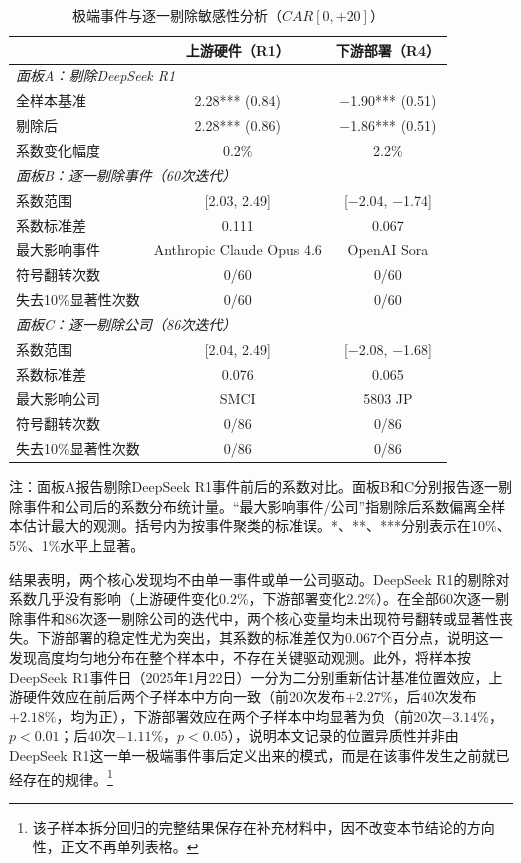 \documentclass[11pt,fontset=fandol,a4paper]{ctexart}
\newcommand{\changed}[1]{#1}
\newcommand{\revise}[1]{#1}
\begin{document}
\begin{table}[H]
\centering
\small
\begin{threeparttable}
\caption{极端事件与逐一剔除敏感性分析（$CAR[0,+20]$）}
\label{tab:r3_sensitivity}
\begin{tabular}{lcc}
\toprule
 & 上游硬件（R1） & 下游部署（R4） \\
\midrule
\multicolumn{3}{l}{\textit{面板A：剔除DeepSeek R1}} \\
\quad 全样本基准 & 2.28*** (0.84) & $-$1.90*** (0.51) \\
\quad 剔除后 & 2.28*** (0.86) & $-$1.86*** (0.51) \\
\quad 系数变化幅度 & 0.2\% & 2.2\% \\[6pt]
\multicolumn{3}{l}{\textit{面板B：逐一剔除事件（60次迭代）}} \\
\quad 系数范围 & [2.03, 2.49] & [$-$2.04, $-$1.74] \\
\quad 系数标准差 & 0.111 & 0.067 \\
\quad 最大影响事件 & \revise{Anthropic Claude Opus 4.6} & \revise{OpenAI Sora} \\
\quad 符号翻转次数 & 0/60 & 0/60 \\
\quad 失去10\%显著性次数 & 0/60 & 0/60 \\[6pt]
\multicolumn{3}{l}{\textit{面板C：逐一剔除公司（86次迭代）}} \\
\quad 系数范围 & [2.04, 2.49] & [$-$2.08, $-$1.68] \\
\quad 系数标准差 & 0.076 & 0.065 \\
\quad 最大影响公司 & SMCI & 5803 JP \\
\quad 符号翻转次数 & 0/86 & 0/86 \\
\quad 失去10\%显著性次数 & 0/86 & 0/86 \\
\bottomrule
\end{tabular}
\begin{tablenotes}
\footnotesize
\item \changed{注：面板A报告剔除DeepSeek R1事件前后的系数对比。面板B和C分别报告逐一剔除事件和公司后的系数分布统计量。“最大影响事件/公司”指剔除后系数偏离全样本估计最大的观测。括号内为按事件聚类的标准误。*、**、***分别表示在10\%、5\%、1\%水平上显著。}
\end{tablenotes}
\end{threeparttable}
\end{table}

结果表明，两个核心发现均不由单一事件或单一公司驱动。DeepSeek R1的剔除对系数几乎没有影响（上游硬件变化0.2\%，下游部署变化2.2\%）。在全部60次逐一剔除事件和86次逐一剔除公司的迭代中，两个核心变量均未出现符号翻转或显著性丧失。下游部署的稳定性尤为突出，其系数的标准差仅为0.067个百分点，说明这一发现高度均匀地分布在整个样本中，不存在关键驱动观测。此外，将样本按DeepSeek R1事件日（2025年1月22日）一分为二分别重新估计基准位置效应，上游硬件效应在前后两个子样本中方向一致（前20次发布$+2.27\%$，后40次发布$+2.18\%$，均为正），下游部署效应在两个子样本中均显著为负（前20次$-3.14\%$，$p<0.01$；后40次$-1.11\%$，$p<0.05$），说明本文记录的位置异质性并非由DeepSeek R1这一单一极端事件事后定义出来的模式，而是在该事件发生之前就已经存在的规律。\footnote{该子样本拆分回归的完整结果保存在补充材料中，因不改变本节结论的方向性，正文不再单列表格。}
\end{document}
